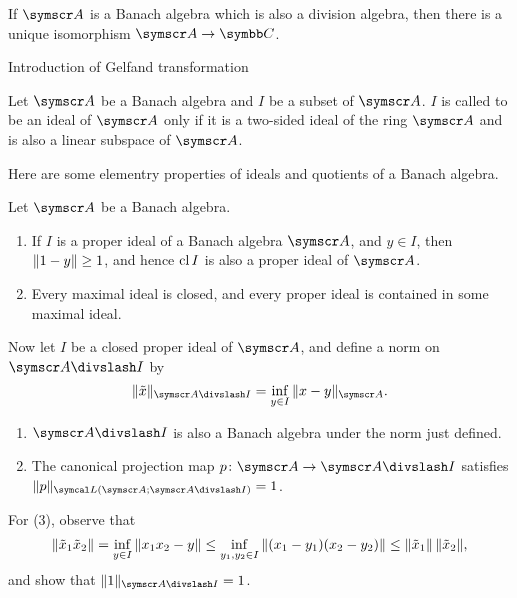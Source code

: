 \begin{theorem}
  If $\BA A$ is a Banach algebra which is also a division algebra, then there is a unique isomorphism $\BA A\to \CC$.
\end{theorem}

Introduction of Gelfand transformation

\begin{definition}
  Let $\BA A$ be a Banach algebra and $I$ be a subset of $\BA A$. $I$ is called to be an ideal of $\BA A$ only if it is a two-sided ideal of the ring $\BA A$ and is also a linear subspace of $\BA A$.
\end{definition}

Here are some elementry properties of ideals and quotients of a Banach algebra.

\begin{proposition}
  Let $\BA A$ be a Banach algebra.
  \begin{enumerate}
    \item If $I$ is a proper ideal of a Banach algebra $\BA A$, and $y\in I$, then $\Vert1-y\Vert\geq 1$, and hence $\operatorname{cl} I$ is also a proper ideal of $\BA A$.
    \item Every maximal ideal is closed, and every proper ideal is contained in some maximal ideal.
  \end{enumerate}

  Now let $I$ be a closed proper ideal of $\BA A$, and define a norm on $\BA A\DIV I$ by
  \begin{equation*}
    \NORM{\tilde x}_{\BA A\DIV I}=\inf_{y\in I}\NORM{x-y}_{\BA A}.
  \end{equation*}
  \begin{enumerate}[resume*]
    \item $\BA A\DIV I$ is also a Banach algebra under the norm just defined.
    \item The canonical projection map $p\colon\BA A\to \BA A\DIV I$ satisfies $\NORM{p}_{\symcal L(\BA A; \BA A\DIV I)}=1$.
  \end{enumerate}
\end{proposition}

\begin{hint}
  For (3), observe that
  \begin{equation*}
    \Vert\tilde x_1\tilde x_2\Vert=\inf_{y\in I}\Vert x_1x_2-y\Vert\leq\inf_{y_1, y_2\in I}\Vert(x_1-y_1)(x_2-y_2)\Vert\leq \Vert\tilde x_1\Vert\,\Vert\tilde x_2\Vert,
  \end{equation*}
  and show that $\NORM{1}_{\BA A\DIV I}=1$.
\end{hint}

